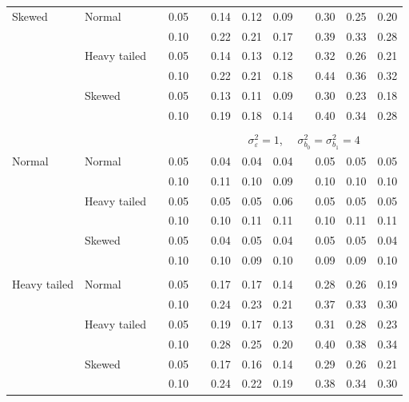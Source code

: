 \documentclass[12pt]{article} %
\begin{document}
\begin{table}[ht]
\begin{scriptsize}
\begin{center}
\begin{tabular}{ll p{.1cm} c p{.1cm} rrr p{.1cm} rrr}
Skewed       & Normal       && 0.05 &&  0.14 & 0.12 & 0.09 && 0.30 & 0.25 & 0.20 \\ 
             &              && 0.10 &&  0.22 & 0.21 & 0.17 && 0.39 & 0.33 & 0.28 \\ 
             & Heavy tailed && 0.05 &&  0.14 & 0.13 & 0.12 && 0.32 & 0.26 & 0.21 \\ 
             &              && 0.10 &&  0.22 & 0.21 & 0.18 && 0.44 & 0.36 & 0.32 \\ 
             & Skewed       && 0.05 &&  0.13 & 0.11 & 0.09 && 0.30 & 0.23 & 0.18 \\ 
             &              && 0.10 &&  0.19 & 0.18 & 0.14 && 0.40 & 0.34 & 0.28 \\ 


&&&&&&&&&&&\\
& && && \multicolumn{7}{c}{$\sigma_{\varepsilon}^2 = 1$, \ \ $\sigma_{b_0}^2 = \sigma_{b_1}^2 = 4$} \\ \cline{6-12}
\rowcolor{gray!20}Normal       & Normal       && 0.05 &&  0.04 & 0.04 & 0.04 && 0.05 & 0.05 & 0.05 \\ 
\rowcolor{gray!20}             &              && 0.10 &&  0.11 & 0.10 & 0.09 && 0.10 & 0.10 & 0.10 \\ 
\rowcolor{gray!20}             & Heavy tailed && 0.05 &&  0.05 & 0.05 & 0.06 && 0.05 & 0.05 & 0.05 \\ 
\rowcolor{gray!20}             &              && 0.10 &&  0.10 & 0.11 & 0.11 && 0.10 & 0.11 & 0.11 \\ 
\rowcolor{gray!20}             & Skewed       && 0.05 &&  0.04 & 0.05 & 0.04 && 0.05 & 0.05 & 0.04 \\ 
\rowcolor{gray!20}             &              && 0.10 &&  0.10 & 0.09 & 0.10 && 0.09 & 0.09 & 0.10 \\
             &&&&&&&&&&&\\ 
Heavy tailed & Normal       && 0.05 &&  0.17 & 0.17 & 0.14 && 0.28 & 0.26 & 0.19 \\ 
             &              && 0.10 &&  0.24 & 0.23 & 0.21 && 0.37 & 0.33 & 0.30 \\ 
             & Heavy tailed && 0.05 &&  0.19 & 0.17 & 0.13 && 0.31 & 0.28 & 0.23 \\ 
             &              && 0.10 &&  0.28 & 0.25 & 0.20 && 0.40 & 0.38 & 0.34 \\ 
             & Skewed       && 0.05 &&  0.17 & 0.16 & 0.14 && 0.29 & 0.26 & 0.21 \\ 
             &              && 0.10 &&  0.24 & 0.22 & 0.19 && 0.38 & 0.34 & 0.30 \\ 

\end{tabular}
\end{center}
\end{scriptsize}
\end{table}
\end{document}
